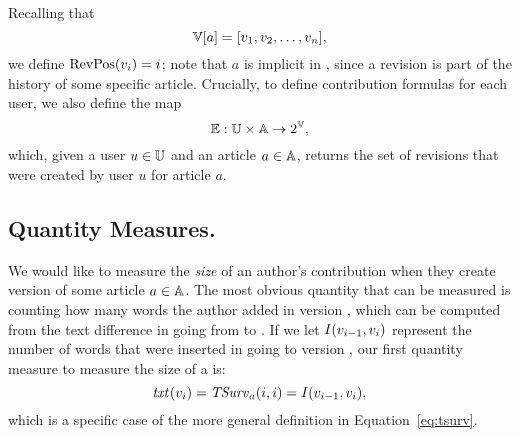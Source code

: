 Recalling that
\begin{equation*}
    \versions{a} = [ \version{1}, \version{2}, \ldots, \version{n} ],
\end{equation*}
we define $\mathrm{RevPos}(v_{i}) = i$;
note that $a$ is implicit in , since a revision
is part of the history of some specific article.
Crucially, to define contribution formulas for each user,
we also define the map
\begin{equation*}
\authorrevs{} : \users \times \articles \to 2^\versions{},
\end{equation*}
which, given a user $u \in \mathbb{U}$ and an article $a \in \mathbb{A}$, returns
the set of revisions that were created by user $u$ for article $a$.

\subsection{Quantity Measures.}

We would like to measure the \textit{size} of an author's contribution
when they create version  of some article $a \in \mathbb{A}$.
The most obvious quantity that can be measured is counting how
many words the author added in version ,
which can be computed from the text difference in going from
 to .
If we let $I(v_{i-1}, v_{i})$ represent the number
of words that were inserted in going to version ,
our first quantity measure to measure the size of a
 is:
\begin{equation*}
\mathit{txt}_{}(v_{i}) = \mathit{TSurv}_{a}(i,i) = I(v_{i-1},v_{i}),
\end{equation*}
which is a specific case of the more general
definition in Equation~\ref{eq:tsurv}.


